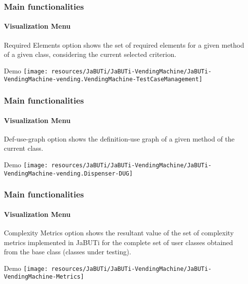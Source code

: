 \begin{frame}
\frametitle{Main functionalities}
\framesubtitle{Visualization Menu}
\label{concept:required-elements}

\begin{block}{Required Elements}
 option shows the set of required elements for a
given method of a given class, considering the current selected criterion.
\end{block}

\begin{block}{Demo}
\texttt{[image: resources/JaBUTi/JaBUTi-VendingMachine/JaBUTi-VendingMachine-vending.VendingMachine-TestCaseManagement]}
\end{block}
\end{frame}



\begin{frame}
\frametitle{Main functionalities}
\framesubtitle{Visualization Menu}
\label{concept:def-use-graph}

\begin{block}{Def-use-graph}
 option shows the definition-use graph of a given
method of the current class.
\end{block}

\begin{block}{Demo}
\texttt{[image: resources/JaBUTi/JaBUTi-VendingMachine/JaBUTi-VendingMachine-vending.Dispenser-DUG]}
\end{block}
\end{frame}



\begin{frame}
\frametitle{Main functionalities}
\framesubtitle{Visualization Menu}
\label{concept:complexity-metrics}

\begin{block}{Complexity Metrics}
 option shows the resultant value of the set of
complexity metrics implemented in JaBUTi for the complete set of user classes
obtained from the base class (classes under testing).
\end{block}

\begin{block}{Demo}
\texttt{[image: resources/JaBUTi/JaBUTi-VendingMachine/JaBUTi-VendingMachine-Metrics]}
\end{block}
\end{frame}